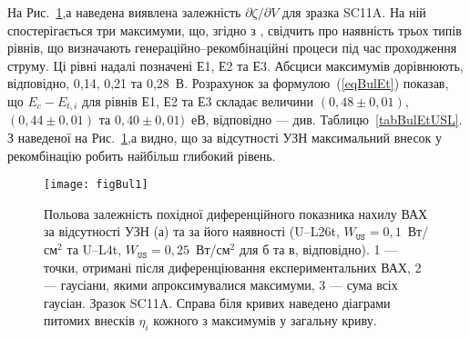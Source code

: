 На Рис.~\ref{figBul1},а наведена виявлена залежність $\partial \zeta/ \partial V $ для зразка SC11A.
На ній спостерігається три максимуми, що, згідно з \cite{Bulyar}, свідчить про наявність
трьох типів рівнів, що визначають генераційно--рекомбінаційні процеси під час проходження струму.
Ці рівні надалі позначені Е1, Е2 та Е3.
Абсциси максимумів дорівнюють, відповідно, 0,14, 0,21 та 0,28~В.
Розрахунок за формулою~(\ref{eqBulEt}) показав,
що  $E_c-E_{t,i}$ для рівнів  Е1, Е2 та Е3 складає величини $(0,48\pm0,01)$, $(0,44\pm0,01)$ та $0,40\pm0,01)$~еВ, відповідно --- див. Таблицю~\ref{tabBulEtUSL}.
З наведеної на Рис.~\ref{figBul1},а видно, що за відсутності УЗН максимальний внесок у рекомбінацію робить найбільш глибокий рівень.


\begin{figure}
\center
\texttt{[image: figBul1]}
\caption{\label{figBul1}
Польова залежність похідної диференційного показника нахилу ВАХ за відсутності УЗН (а)
та за його наявності (U--L26t, $W_\mathtt{US}=0,1$~Вт/см$^2$ та U--L4t,  $W_\mathtt{US}=0,25$~Вт/см$^2$ для б та в, відповідно).
1 --- точки, отримані після диференціювання експериментальних ВАХ,
2 --- гаусіани, якими апроксимувалися максимуми,
3 --- сума всіх гаусіан.
Зразок SC11A.
Справа біля кривих наведено діаграми питомих внесків $\eta_i$ кожного з максимумів у загальну криву.
}%
\end{figure}


